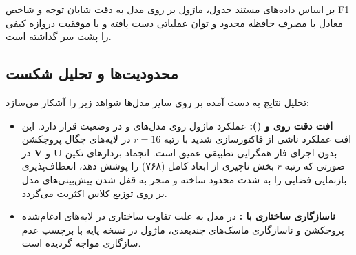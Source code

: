 بر اساس داده‌های مستند جدول، ماژول  بر روی مدل  به دقت شایان توجه  و شاخص F1 معادل  با مصرف حافظه محدود  و توان عملیاتی  دست یافته و با موفقیت دروازه کیفی  را پشت سر گذاشته است.

\subsection{محدودیت‌ها و تحلیل شکست}
تحلیل نتایج به دست آمده بر روی سایر مدل‌ها شواهد زیر را آشکار می‌سازد:
\begin{itemize}
    \item \textbf{افت دقت روی  و  ():} عملکرد ماژول روی مدل‌های  و  در وضعیت  قرار دارد. این افت عملکرد ناشی از فاکتورسازی شدید با رتبه $r=16$ در لایه‌های چگال پروجکشن بدون اجرای فاز همگرایی تطبیقی عمیق است. انجماد بردارهای تکین $\mathbf{U}$ و $\mathbf{V}$ در صورتی که رتبه $r$ بخش ناچیزی از ابعاد کامل (۷۶۸) را پوشش دهد، انعطاف‌پذیری بازنمایی فضایی را به شدت محدود ساخته و منجر به قفل شدن پیش‌بینی‌های مدل بر روی توزیع کلاس اکثریت می‌گردد.
    \item \textbf{ناسازگاری ساختاری با :} در مدل  به علت تفاوت ساختاری در لایه‌های ادغام‌شده پروجکشن  و ناسازگاری ماسک‌های چندبعدی، ماژول در نسخه پایه با برچسب عدم سازگاری مواجه گردیده است.
\end{itemize}
